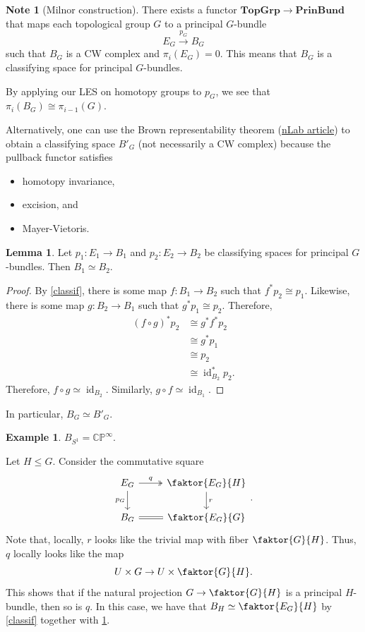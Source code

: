\documentclass[10pt,letterpaper,cm]{nupset}
\theoremstyle{definition}
\newtheorem{exmp}[defn]{Example}
\newtheorem{note}[defn]{Note}
\theoremstyle{theorem}
\newtheorem{lemma}[defn]{Lemma}
\theoremstyle{remark}
\newcommand{\CP}{\mathbb{CP}}
\newcommand{\1}{\mathbb{1}}
\newcommand{\0}{\vec 0}
\DeclareMathOperator{\id}{id}
\newcommand{\bi}{\begin{itemize}}
\newcommand{\ei}{\end{itemize}}
\begin{document}
\begin{note}[Milnor construction]
There exists a functor $\mathbf{TopGrp} \to \mathbf{PrinBund}$ that maps each topological group $G$ to a principal $G$-bundle $$E_G \overset{p_G}{\longrightarrow} B_G$$ such that $B_G$ is a CW complex and $\pi_i\left(E_G\right) =0$. This means that $B_G$ is a classifying space for principal $G$-bundles.

\smallskip

By applying our LES on homotopy groups to $p_G$, we see that  $\pi_i\left(B_G\right) \cong \pi_{i-1}\left(G\right)$.
\end{note}


Alternatively, one can use the Brown representability theorem (\href{https://ncatlab.org/nlab/show/Brown+representability+theorem}{nLab article}) to obtain a classifying space $B'_G$ (not necessarily a CW complex) because the pullback functor satisfies
\bi
\item homotopy invariance,
\item excision, and
\item Mayer-Vietoris.
\ei

\begin{lemma}\label{uniq}
Let $p_1: E_1 \to B_1$ and $p_2 : E_2 \to B_2$ be classifying spaces for principal $G$-bundles. Then $B_1 \simeq B_2$. 
\end{lemma}
\begin{proof}
By \cref{classif}, there is some map $f : B_1 \to B_2$ such that $f^{\ast}{p_2} \cong  p_1$. Likewise, there is some map $g: B_2 \to B_1$ such that $g^{\ast}{p_1}\cong p_2$. Therefore, 
\begin{align*}
\left(f \circ g\right)^{\ast}{p_2} & \cong g^{\ast}{f^{\ast}{p_2}} 
\\ & \cong g^{\ast}{p_1}
\\ & \cong p_2
\\ & \cong \id_{B_2}^{\ast}{p_2}.
\end{align*}
Therefore, $f \circ g \simeq \id_{B_2}$. Similarly, $g\circ f \simeq \id_{B_1}$.
\end{proof}

In particular, $B_G \simeq B'_G$.

\begin{exmp}
$B_{S^1} = \CP^{\infty}$.
\end{exmp}


Let $H\leq G$. Consider the commutative square
\[
\begin{tikzcd}
E_G \arrow[d, "p_G"'] \arrow[r, "q", two heads] & \faktor{E_G}{H} \arrow[d, "r"] \\
B_G \arrow[r, equals]                                   & \faktor{E_G}{G}               
\end{tikzcd}.
\]  Note that, locally, $r$ looks like the trivial map with fiber $\faktor{G}{H}$. Thus, $q$ locally looks like the map $$U \times G \to U \times \faktor{G}{H}.$$ This shows that if the natural projection $G \to \faktor{G}{H}$ is a principal $H$-bundle, then so is $q$. In this case, we have that $B_H \simeq \faktor{E_G}{H}$ by \cref{classif} together with \cref{uniq}.
\end{document}
